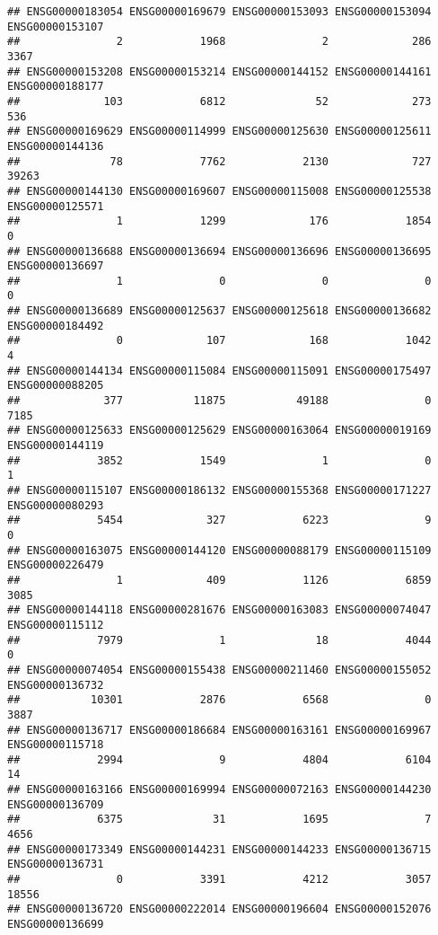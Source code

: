 \documentclass[
]{article}
\begin{document}
\begin{verbatim}
## ENSG00000183054 ENSG00000169679 ENSG00000153093 ENSG00000153094 ENSG00000153107 
##               2            1968               2             286            3367 
## ENSG00000153208 ENSG00000153214 ENSG00000144152 ENSG00000144161 ENSG00000188177 
##             103            6812              52             273             536 
## ENSG00000169629 ENSG00000114999 ENSG00000125630 ENSG00000125611 ENSG00000144136 
##              78            7762            2130             727           39263 
## ENSG00000144130 ENSG00000169607 ENSG00000115008 ENSG00000125538 ENSG00000125571 
##               1            1299             176            1854               0 
## ENSG00000136688 ENSG00000136694 ENSG00000136696 ENSG00000136695 ENSG00000136697 
##               1               0               0               0               0 
## ENSG00000136689 ENSG00000125637 ENSG00000125618 ENSG00000136682 ENSG00000184492 
##               0             107             168            1042               4 
## ENSG00000144134 ENSG00000115084 ENSG00000115091 ENSG00000175497 ENSG00000088205 
##             377           11875           49188               0            7185 
## ENSG00000125633 ENSG00000125629 ENSG00000163064 ENSG00000019169 ENSG00000144119 
##            3852            1549               1               0               1 
## ENSG00000115107 ENSG00000186132 ENSG00000155368 ENSG00000171227 ENSG00000080293 
##            5454             327            6223               9               0 
## ENSG00000163075 ENSG00000144120 ENSG00000088179 ENSG00000115109 ENSG00000226479 
##               1             409            1126            6859            3085 
## ENSG00000144118 ENSG00000281676 ENSG00000163083 ENSG00000074047 ENSG00000115112 
##            7979               1              18            4044               0 
## ENSG00000074054 ENSG00000155438 ENSG00000211460 ENSG00000155052 ENSG00000136732 
##           10301            2876            6568               0            3887 
## ENSG00000136717 ENSG00000186684 ENSG00000163161 ENSG00000169967 ENSG00000115718 
##            2994               9            4804            6104              14 
## ENSG00000163166 ENSG00000169994 ENSG00000072163 ENSG00000144230 ENSG00000136709 
##            6375              31            1695               7            4656 
## ENSG00000173349 ENSG00000144231 ENSG00000144233 ENSG00000136715 ENSG00000136731 
##               0            3391            4212            3057           18556 
## ENSG00000136720 ENSG00000222014 ENSG00000196604 ENSG00000152076 ENSG00000136699 

\end{verbatim}
\end{document}
